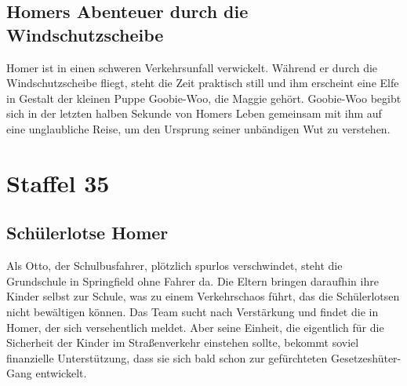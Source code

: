 
\subsection{Homers Abenteuer durch die Windschutzscheibe}\label{OABF13}
Homer ist in einen schweren Verkehrsunfall verwickelt. Während er durch die Windschutzscheibe fliegt, steht die Zeit praktisch still und ihm erscheint eine Elfe in Gestalt der kleinen Puppe Goobie-Woo, die Maggie gehört. Goobie-Woo begibt sich in der letzten halben Sekunde von Homers Leben gemeinsam mit ihm auf eine unglaubliche Reise, um den Ursprung seiner unbändigen Wut zu verstehen.


\section{Staffel 35}

\subsection{Schülerlotse Homer}
Als Otto, der Schulbusfahrer, plötzlich spurlos verschwindet, steht die Grundschule in Springfield ohne Fahrer da. Die Eltern bringen daraufhin ihre Kinder selbst zur Schule, was zu einem Verkehrschaos führt, das die Schülerlotsen nicht bewältigen können. Das Team sucht nach Verstärkung und findet die in Homer, der sich versehentlich meldet. Aber seine Einheit, die eigentlich für die Sicherheit der Kinder im Straßenverkehr einstehen sollte, bekommt soviel finanzielle Unterstützung, dass sie sich bald schon zur gefürchteten Gesetzeshüter-Gang entwickelt.

